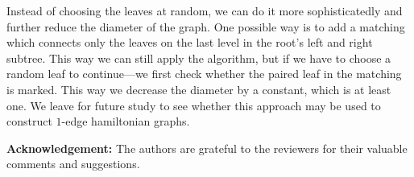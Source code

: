 \documentclass[10pt,a4paper]{article}
\begin{document}
Instead of choosing the leaves at random, we can do it more
sophisticatedly and further reduce the diameter of the graph. One
possible way is to add a matching which connects only the leaves on
the last level in the root's left and right subtree. This way we can
still apply the algorithm, but if we have to choose a random leaf to
continue---we first check whether the paired leaf in the matching is
marked. This way we decrease the diameter by a constant, which is at
least one. We leave for future study to see whether this approach
may be used to construct $1$-edge hamiltonian graphs. \vspace{0.2cm}

{\bf Acknowledgement: } The authors are grateful to the reviewers
for their valuable comments and suggestions.
\end{document}
